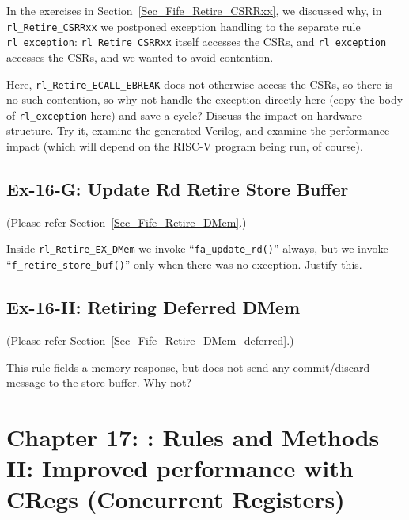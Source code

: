 In the exercises in Section~\ref{Sec_Fife_Retire_CSRRxx}, we discussed
why, in \verb|rl_Retire_CSRRxx| we postponed exception handling to the
separate rule \verb|rl_exception|: \verb|rl_Retire_CSRRxx| itself
accesses the CSRs, and \verb|rl_exception| accesses the CSRs, and we
wanted to avoid contention.

\vspace{1ex}

Here, \verb|rl_Retire_ECALL_EBREAK| does not otherwise access the
CSRs, so there is no such contention, so why not handle the exception
directly here (copy the body of \verb|rl_exception| here) and save a
cycle?  Discuss the impact on hardware structure.  Try it, examine the
generated Verilog, and examine the performance impact (which will
depend on the RISC-V program being run, of course).


\subsection*{Ex-16-G: Update Rd {\vs} Retire Store Buffer}
\label{Ex-16-G-Rd-vs-Store-Buffer}

(Please refer Section~\ref{Sec_Fife_Retire_DMem}.)

Inside \verb|rl_Retire_EX_DMem| we invoke ``\verb|fa_update_rd()|''
always, but we invoke ``\verb|f_retire_store_buf()|'' only when there
was no exception.  Justify this.


\subsection*{Ex-16-H: Retiring Deferred DMem}
\label{Ex-16-H-Retiring Deferred DMem}

(Please refer Section~\ref{Sec_Fife_Retire_DMem_deferred}.)

This rule fields a memory response, but does not send any
commit/discard message to the store-buffer.  Why not?


\hdivider

\section*{Chapter 17: {\BSV}: Rules and Methods II: Improved performance with CRegs (Concurrent Registers)}


